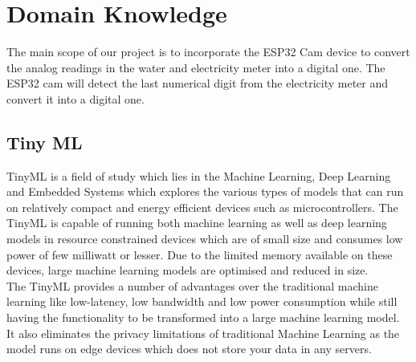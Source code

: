 %
%
%
%

\graphicspath{ {./images/} }

\chapter{Domain Knowledge}\label{DomainKnowledge}
The main scope of our project is to incorporate the ESP32 Cam device to convert the analog readings in the water and electricity meter into a digital one. The ESP32 cam will detect the last numerical digit from the electricity meter and convert it into a digital one.
\section{Tiny ML}
TinyML is a field of study which lies in the Machine Learning, Deep Learning and Embedded Systems which explores the various types of models that can run on relatively compact and energy efficient devices such as microcontrollers.\autocite{Arun:2020} The TinyML is capable of running both machine learning as well as deep learning models in resource constrained devices which are of small size and consumes low power of few milliwatt or lesser. Due to the limited memory available on these devices, large machine learning models are optimised and reduced in size.\\

The TinyML provides a number of advantages over the traditional machine learning like low-latency, low bandwidth and low power consumption while still having the functionality to be transformed into a large machine learning model. It also eliminates the privacy limitations of traditional Machine Learning as the model runs on edge devices which does not store your data in any servers.\autocite{Arun:2020}

